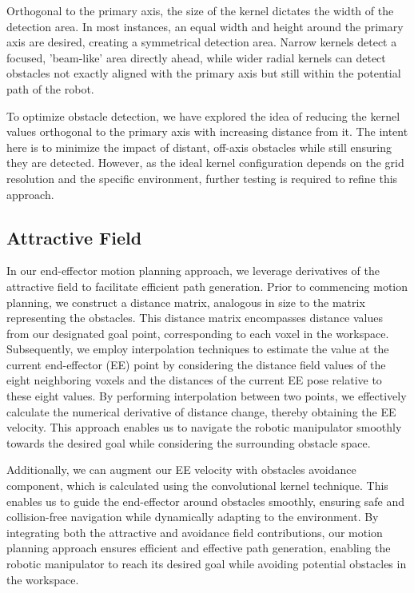 \documentclass[a4paper]{article}
\begin{document}
Orthogonal to the primary axis, the size of the kernel dictates the width of the detection area. In most instances, an equal width and height around the primary axis are desired, creating a symmetrical detection area. Narrow kernels detect a focused, 'beam-like' area directly ahead, while wider radial kernels can detect obstacles not exactly aligned with the primary axis but still within the potential path of the robot.

To optimize obstacle detection, we have explored the idea of reducing the kernel values orthogonal to the primary axis with increasing distance from it. The intent here is to minimize the impact of distant, off-axis obstacles while still ensuring they are detected. However, as the ideal kernel configuration depends on the grid resolution and the specific environment, further testing is required to refine this approach.
		 
\subsection{Attractive Field}


In our end-effector motion planning approach, we leverage derivatives of the attractive field to facilitate efficient path generation. Prior to commencing motion planning, we construct a distance matrix, analogous in size to the matrix representing the obstacles. This distance matrix encompasses distance values from our designated goal point, corresponding to each voxel in the workspace. Subsequently, we employ interpolation techniques to estimate the value at the current end-effector (EE) point by considering the distance field values of the eight neighboring voxels and the distances of the current EE pose relative to these eight values. By performing interpolation between two points, we effectively calculate the numerical derivative of distance change, thereby obtaining the EE velocity. This approach enables us to navigate the robotic manipulator smoothly towards the desired goal while considering the surrounding obstacle space.

Additionally, we can augment our EE velocity with obstacles avoidance component, which is calculated using the convolutional kernel technique. This enables us to guide the end-effector around obstacles smoothly, ensuring safe and collision-free navigation while dynamically adapting to the environment. By integrating both the attractive and avoidance field contributions, our motion planning approach ensures efficient and effective path generation, enabling the robotic manipulator to reach its desired goal while avoiding potential obstacles in the workspace.
\end{document}
